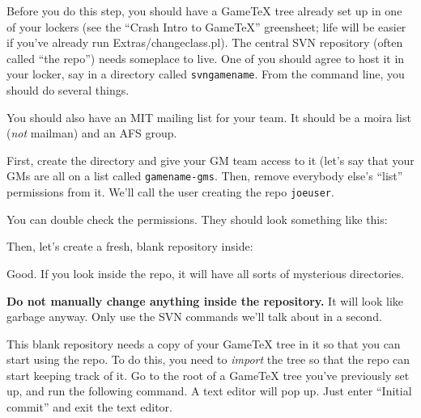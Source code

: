 \documentclass[green]{testgame}
\begin{document}
Before you do this step, you should have a GameTeX tree already set up
in one of your lockers (see the ``Crash Intro to GameTeX'' greensheet;
life will be easier if you've already run Extras/changeclass.pl). The
central SVN repository (often called ``the repo'') needs someplace to
live. One of you should agree to host it in your locker, say in a
directory called {\tt svngamename}. From the command line, you should
do several things.

You should also have an MIT mailing list for your team.  It should
be a moira list ({\em not} mailman) and an AFS group.

First, create the directory and give your GM team access to it (let's
say that your GMs are all on a list called {\tt gamename-gms}. Then,
remove everybody else's ``list'' permissions from it. We'll call the
user creating the repo {\tt joeuser}.


You can double check the permissions. They should look something like
this:


Then, let's create a fresh, blank repository inside:


Good. If you look inside the repo, it will have all sorts of
mysterious directories. 


{\bf Do not manually change anything inside the repository.} It will
look like garbage anyway. Only use the SVN commands we'll talk about
in a second.

This blank repository needs a copy of your GameTeX tree in it so that
you can start using the repo. To do this, you need to {\em import} the
tree so that the repo can start keeping track of it. Go to the root of
a GameTeX tree you've previously set up, and run the following
command. A text editor will pop up. Just enter ``Initial commit'' and
exit the text editor.
\end{document}

